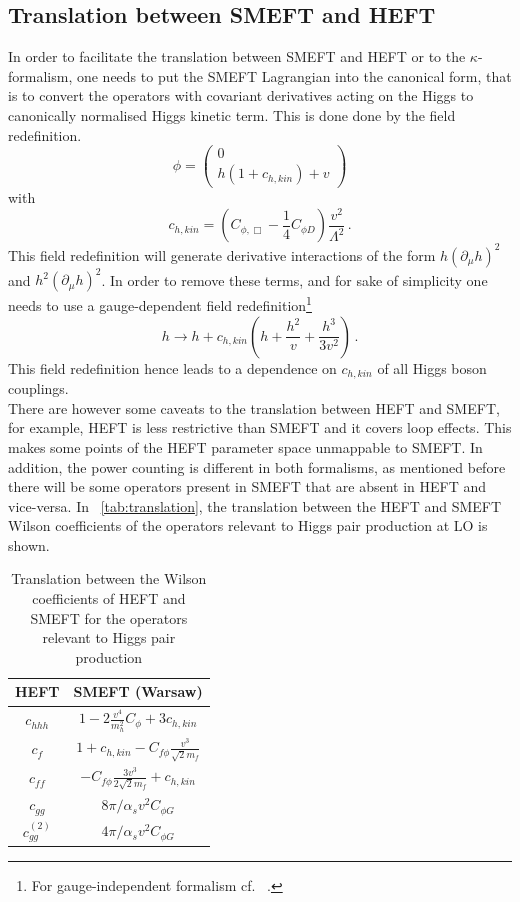 \subsection{Translation between SMEFT and HEFT }
In order to facilitate the translation between SMEFT and HEFT or to the $\kappa$-formalism, one needs to put the SMEFT Lagrangian into the canonical form, that is to convert the operators with covariant derivatives acting on the Higgs to  canonically normalised Higgs kinetic term. This is done done by the field redefinition.
\begin{equation}
	\phi=\left( \begin{array}{c} 0 \\ h(1+c_{h,kin}) + v \end{array} \right)
\end{equation} 
with 
\begin{equation}
	c_{h,kin}=\left(C_{\phi,\Box}-\frac{1}{4}C_{\phi D}\right) \frac{v^2}{\Lambda^2}\,.
\end{equation}
This field redefinition will generate derivative interactions of the form $h(\partial_{\mu}h)^2$ and $h^2(\partial_{\mu}h)^2$. In order to remove these terms, and for sake of simplicity one needs to use a gauge-dependent field redefinition\footnote{For gauge-independent formalism cf.~ \cite{Hartmann:2015aia}.}
\begin{equation}
	h \to h + c_{h,kin}\left( h +\frac{h^2}{v}+\frac{h^3}{3v^2}\right)\,. \label{fieldref}
\end{equation}
This field redefinition hence leads to a dependence on $c_{h,kin}$ of all Higgs boson couplings. \\
There are however some caveats to the translation between HEFT and SMEFT, for example, HEFT is less restrictive than SMEFT and it covers loop effects. This makes some points of the HEFT parameter space unmappable to SMEFT. In addition, the power counting is different in both formalisms, as mentioned before there will be some operators present in SMEFT that are absent in HEFT and vice-versa.  In ~\autoref{tab:translation}, the translation between the HEFT and SMEFT Wilson coefficients of the  operators relevant to Higgs pair production at LO is shown. 
\begin{table}[htb]
	\begin{center}
		\begin{tabular}{ c c }
			\toplinetwo
			HEFT& SMEFT (Warsaw)\\
			\midrule
			$c_{hhh}$&$1-2\frac{v^4}{m_h^2}C_\phi+3c_{h,kin}$ \\
			$c_f$ & $1+c_{h,kin} -C_{f\phi} \frac{v^3}{\sqrt{2} m_f}$\\
			$ c_{ff} $ &$-C_{f\phi} \frac{3 v^3}{2\sqrt{2} m_f} + c_{h,kin}$\\
			$c_{gg}$  & $8\pi/\alpha_s v^2 C_{\phi G}$ \\
			$c_{gg}^{(2)}$  & $4\pi/\alpha_s v^2 C_{\phi G}$ \\
			\bottomrule
		\end{tabular}
	\end{center}
	\caption{Translation between the Wilson coefficients of HEFT and SMEFT for the operators relevant to Higgs pair production  \label{tab:translation}}
\end{table}
